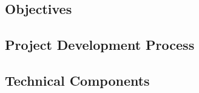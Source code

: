 
\subsection{Objectives}
\subsection{Project Development Process} %
\subsection{Technical Components}
